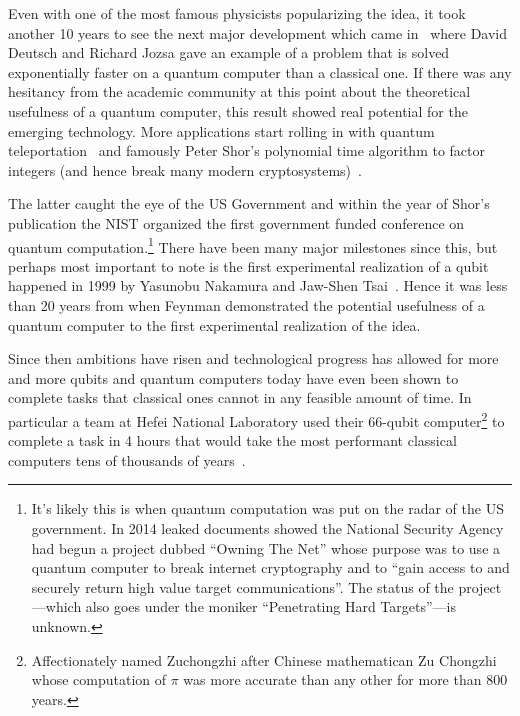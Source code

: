 Even with one of the most famous physicists popularizing the idea, it took another 10 years to see the next major development which came in~\cite{deutch-jozsa-algo} where David Deutsch and Richard Jozsa gave an example of a problem that is solved exponentially faster on a quantum computer than a classical one.
If there was any hesitancy from the academic community at this point about the theoretical usefulness of a quantum computer, this result showed real potential for the emerging technology.
More applications start rolling in with quantum teleportation~\cite{quantumteleportation} and famously Peter Shor's polynomial time algorithm to factor integers (and hence break many modern cryptosystems)~\cite{shor-encryption}.

The latter caught the eye of the US Government and within the year of Shor's publication the \ac{NIST} organized the first government funded conference on quantum computation.\footnote{It's likely this is when quantum computation was put on the radar of the US government. In 2014 leaked documents showed the National Security Agency had begun a project dubbed ``Owning The Net'' whose purpose was to use a quantum computer to break internet cryptography and to ``gain access to and securely return high value target communications''. The status of the project---which also goes under the moniker ``Penetrating Hard Targets''---is unknown.}
There have been many major milestones since this, but perhaps most important to note is the first experimental realization of a qubit happened in 1999 by Yasunobu Nakamura and Jaw-Shen Tsai~\cite{firstqubit}.
Hence it was less than 20 years from when Feynman demonstrated the potential usefulness of a quantum computer to the first experimental realization of the idea.

Since then ambitions have risen and technological progress has allowed for more and more qubits and quantum computers today have even been shown to complete tasks that classical ones cannot in any feasible amount of time.
In particular a team at Hefei National Laboratory used their 66-qubit computer\footnote{Affectionately named Zuchongzhi after Chinese mathematican Zu Chongzhi whose computation of $\pi$ was more accurate than any other for more than 800 years.} to complete a task in 4 hours that would take the most performant classical computers tens of thousands of years~\cite{zuchongzhi}.


